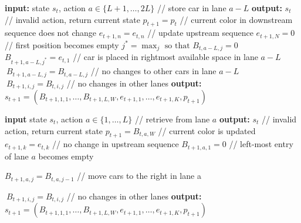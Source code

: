 \documentclass[11pt]{elsarticle}
\begin{document}
\begin{center}
\begin{minipage}{0.6\textwidth}
\begin{algorithm}[H]
\caption{Transition function: Storage \label{alg:transition_storage}}
\footnotesize
\begin{algorithmic}[1]
\State \textbf{input:} state $s_t$, action $a\in \{L+1,\dots, 2L\}$ // store car in lane $a-L$
\State \textbf{output:} $s_t$ // invalid action, return current state
\EndIf
\State $p_{t+1} = p_t$ // current color in downstream sequence does not change
\State$e_{t+1,n}=e_{t,n}$ // update upstream sequence
\EndFor
\State $e_{t+1,N}=0$  // first position becomes empty
\State $j^* = \max_j \text{ so that } B_{t,a-L,j} = 0$
\State $B_{t+1,a-L,j^*} = e_{t,1}$ // car is placed in rightmost available space in lane $a-L$
\State $\ B_{t+1,a-L,j}=B_{t,a-L,j}$ // no changes to other cars in lane $a-L$
\EndFor
{} 
\State $\ B_{t+1,i,j}=B_{t,i,j}$ // no changes in other lanes
\EndFor
\State \textbf{output:} $s_{t+1}= (B_{t+1,1,1},\dots,B_{t+1,L,W}, e_{t+1,1},\dots,e_{t+1,K}, p_{t+1})$
\end{algorithmic}
\end{algorithm}
\end{minipage}
\end{center}



\begin{center}
\begin{minipage}{0.6\textwidth}
\begin{algorithm}[H]
\caption{Transition function: Retrieval \label{alg:transition_retrieval}}
\footnotesize
\begin{algorithmic}[1]
\State \textbf{input} state $s_t$, action $a\in \{1,\dots, L\}$ // retrieve from lane $a$
\State \textbf{output:} $s_t$ // invalid action, return current state
\EndIf
\State$p_{t+1} = B_{t,a,W}$ // current color is updated
\State $e_{t+1,k}=e_{t,k}$  // no change in upstream sequence
\EndFor
\State$B_{t+1,a,1}=0 $      // left-most entry of lane $a$ becomes empty

\State$B_{t+1,a,j}=B_{t,a,j-1}$ // move cars to the right in lane a
\EndFor

\State $\ B_{t+1,i,j}=B_{t,i,j}$ // no changes in other lanes
\EndFor
\State \textbf{output:} $s_{t+1}= (B_{t+1,1,1},\dots,B_{t+1,L,W}, e_{t+1,1},\dots,e_{t+1,K}, p_{t+1})$
\end{algorithmic}
\end{algorithm}
\end{minipage}
\end{center}
\end{document}
